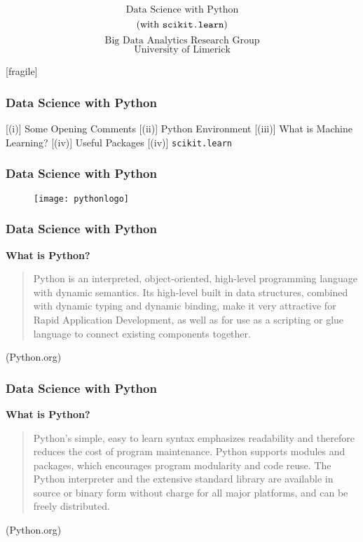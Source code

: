 \documentclass{beamer}
\begin{document}
 
 \huge
 
 \[\mbox{Data Science with Python} \]
 { 
 \[\mbox{(with \texttt{scikit.learn}})\]
}
 \bigskip
 \[ \mbox{Big Data Analytics Research Group} \]
 \[ \mbox{University of Limerick} \]
 
 [fragile]
 \frametitle{Data Science with Python}
  
  
  [(i)] Some Opening Comments
  [(ii)] Python Environment
  [(iii)] What is Machine Learning?
  [(iv)] Useful Packages
  [(iv)] \texttt{scikit.learn}
  
 
 

 
  \frametitle{Data Science with Python}
 \begin{figure}
  \centering
  \texttt{[image: pythonlogo]}
  
 \end{figure}
 
 
 
  \frametitle{Data Science with Python}
  
 \textbf{What is Python?}
 \begin{quote}
  Python is an interpreted, object-oriented, high-level programming language with dynamic semantics. Its high-level built in data structures, combined with dynamic typing and dynamic binding, make it very attractive for Rapid Application Development, as well as for use as a scripting or glue language to connect existing components together. 
 \end{quote}
 
 (Python.org)
 

 
  \frametitle{Data Science with Python}
  
 \textbf{What is Python?}
 \begin{quote}
  Python's simple, easy to learn syntax emphasizes readability and therefore reduces the cost of program maintenance. Python supports modules and packages, which encourages program modularity and code reuse. The Python interpreter and the extensive standard library are available in source or binary form without charge for all major platforms, and can be freely distributed.
 \end{quote}
 (Python.org)
 
\end{document}
